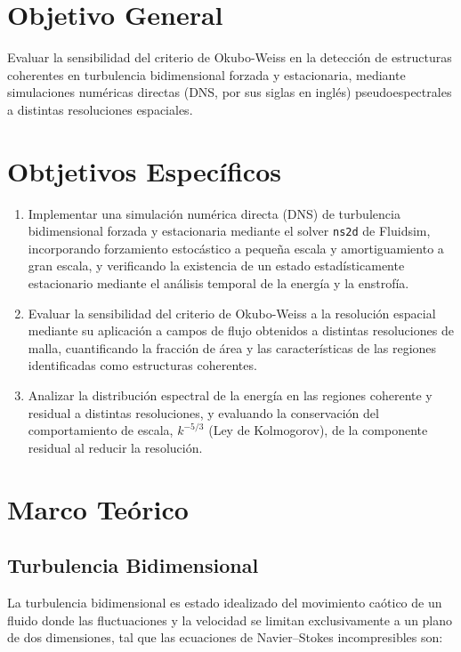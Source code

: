 \section{Objetivo General}
Evaluar la sensibilidad del criterio de Okubo-Weiss 
en la detección de estructuras coherentes en turbulencia
bidimensional forzada y estacionaria, mediante simulaciones 
numéricas directas (DNS, por sus siglas en inglés) pseudoespectrales a 
distintas resoluciones espaciales.

\section{Obtjetivos Específicos}
\begin{enumerate}
    \item Implementar una simulación  numérica directa (DNS) 
	de turbulencia bidimensional 
	forzada y estacionaria mediante el solver \texttt{ns2d} 
	de Fluidsim, incorporando forzamiento estocástico a 
	pequeña escala y amortiguamiento a gran escala, y verificando 
	la existencia de un estado estadísticamente estacionario 
	mediante el análisis temporal de la energía y la enstrofía.

    \item Evaluar la sensibilidad del criterio de Okubo-Weiss a 
	la resolución espacial mediante su aplicación a campos de flujo 
	obtenidos a distintas resoluciones de malla, cuantificando 
	la fracción de área y las características de las regiones 
	identificadas como estructuras coherentes.

    \item Analizar la distribución espectral de la energía en 
	las regiones coherente y residual a distintas resoluciones,  
	y evaluando la conservación del comportamiento de escala, $k^{-5/3}$ (Ley de Kolmogorov),
	de la componente residual al reducir la resolución.
\end{enumerate}

\section{Marco Teórico}

\subsection{Turbulencia Bidimensional}
La turbulencia bidimensional es estado idealizado del movimiento caótico 
de un fluido donde las fluctuaciones y la velocidad se 
limitan exclusivamente a un plano de dos dimensiones, 
tal que las ecuaciones de Navier--Stokes incompresibles son: 

